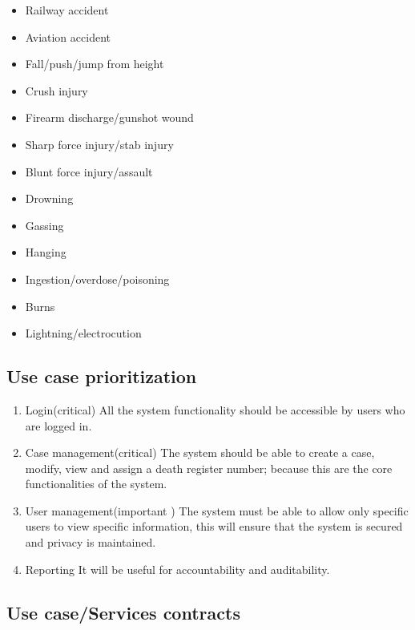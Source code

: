 \documentclass[10pt,a4paper]{article}
\begin{document}
\begin{enumerate}
\begin{enumerate}
\begin{description}
\begin{itemize}
\begin{itemize}
					\end{itemize}
				\item Railway accident
				\item Aviation accident
				\item Fall/push/jump from height
				\item Crush injury
				\item Firearm discharge/gunshot wound
				\item Sharp force injury/stab injury
				\item Blunt force injury/assault
				\item Drowning
				\item Gassing
				\item Hanging
				\item Ingestion/overdose/poisoning
				\item Burns
				\item Lightning/electrocution
			\end{itemize}
		\end{description}
	\end{enumerate}
\end{enumerate}



\subsection{Use case prioritization}
\begin{enumerate}
	\item Login(critical)
		All the system functionality should be accessible by users who are logged in.
	\item Case management(critical)
		The system should be able to create a case, modify, view and assign a death register number; because this are the core functionalities of the system. 
	\item User management(important )
		The system must be able to allow only specific users to view specific information, this will ensure that the system is secured and privacy is maintained.
	\item Reporting
		It will be useful for accountability and auditability.
\end{enumerate}  

\subsection{Use case/Services contracts}
\end{document}
